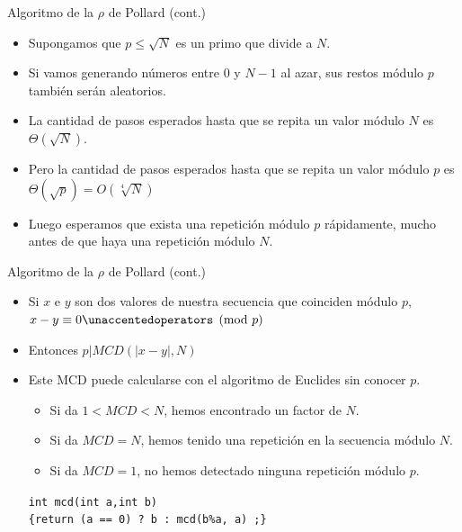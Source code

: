 \documentclass{beamer}
\begin{document}
\begin{frame}{Algoritmo de la $\rho$ de Pollard (cont.)}
    \begin{itemize}
      \item Supongamos que $p \leq \sqrt{N}$ es un primo que divide a $N$.
      \item Si vamos generando números entre $0$ y $N-1$ al azar, sus restos módulo $p$ también serán aleatorios.
      \item La cantidad de pasos esperados hasta que se repita un valor módulo $N$ es $\Theta(\sqrt{N})$.
      \item Pero la cantidad de pasos esperados hasta que se repita un valor módulo $p$ es $\Theta(\sqrt{p}) = O(\sqrt[4]{N})$
      \item Luego esperamos que exista una repetición módulo $p$ rápidamente, mucho antes de que haya una repetición módulo $N$.
      \pause
    \end{itemize}
\end{frame}

\begin{frame}[fragile]{Algoritmo de la $\rho$ de Pollard (cont.)}
    \begin{itemize}
      \item Si $x$ e $y$ son dos valores de nuestra secuencia que coinciden módulo $p$, $x-y \equiv 0 \modulo{p}$
      \item Entonces $p | MCD(|x-y|,N)$
      \item Este MCD puede calcularse con el algoritmo de Euclides sin conocer $p$.
      \begin{itemize}
           \item Si da $1 < MCD < N$, hemos encontrado un factor de $N$.
           \item Si da $MCD=N$, hemos tenido una repetición en la secuencia módulo $N$.
           \item Si da $MCD=1$, no hemos detectado ninguna repetición módulo $p$.
      \end{itemize}
      
           \texttt{int mcd(int a,int b) \\ \{return (a == 0) ? b : mcd(b\%a, a) ;\} }
           
    \end{itemize}
\end{frame}
\end{document}
